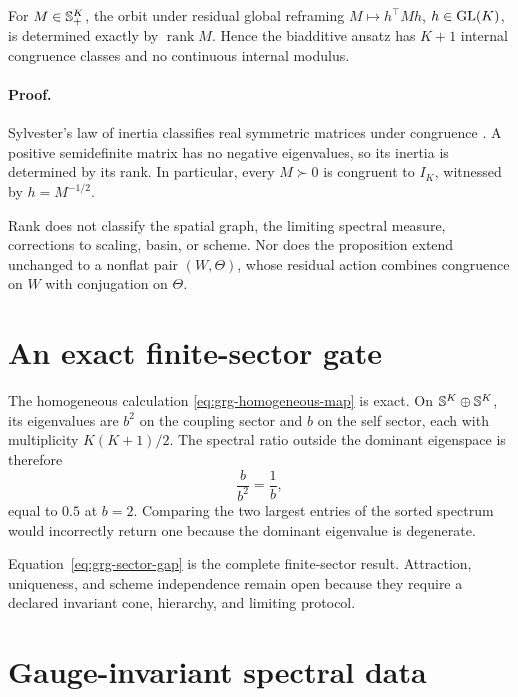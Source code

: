 For \(M\in\mathbb S_{+}^K\), the orbit under residual global reframing
\(M\mapsto h^\top Mh\), \(h\in\mathrm{GL}(K)\), is determined exactly by
\(\operatorname{rank}M\).  Hence the biadditive ansatz has \(K+1\) internal
congruence classes and no continuous internal modulus. 

\paragraph{Proof.}
Sylvester's law of inertia classifies real symmetric matrices under
congruence \citep{HornJohnson2013}.  A positive semidefinite matrix has no
negative eigenvalues, so its inertia is determined by its rank.  In
particular, every \(M\succ0\) is congruent to \(I_K\), witnessed by
\(h=M^{-1/2}\).

Rank does not classify the spatial graph, the limiting spectral measure,
corrections to scaling, basin, or scheme.  Nor does the proposition extend
unchanged to a nonflat pair \((W,\Theta)\), whose residual action combines
congruence on \(W\) with conjugation on \(\Theta\).

\section{An exact finite-sector gate}
\label{sec:grg-numerical-gate}

The homogeneous calculation
\eqref{eq:grg-homogeneous-map} is exact.  On
\(\mathbb S^K\oplus\mathbb S^K\), its eigenvalues are \(b^2\) on the coupling sector
and \(b\) on the self sector, each with multiplicity \(K(K+1)/2\).  The
spectral ratio outside the dominant eigenspace is therefore
\begin{equation}
\frac{b}{b^2}=\frac1b,
\label{eq:grg-sector-gap}
\end{equation}
equal to \(0.5\) at \(b=2\).  Comparing the two largest entries of the sorted
spectrum would incorrectly return one because the dominant eigenvalue is
degenerate. 

Equation~\eqref{eq:grg-sector-gap} is the complete finite-sector result.
Attraction, uniqueness, and scheme independence remain open because they
require a declared invariant cone, hierarchy, and limiting protocol.

\section{Gauge-invariant spectral data}
\label{sec:grg-spectra}

